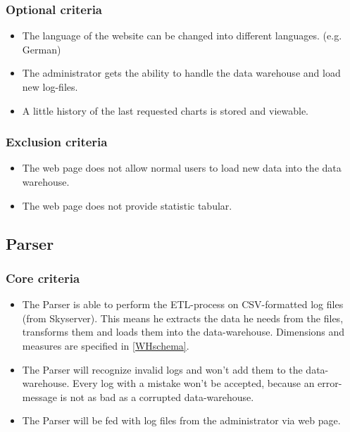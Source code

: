 \subsubsection{Optional criteria}
\begin{itemize}
\item The language of the website can be changed into different languages. (e.g. German)

\item The administrator gets the ability to handle the data warehouse and load new log-files.

\item A little history of the last requested charts is stored and viewable.
\end{itemize}

\subsubsection{Exclusion criteria}
\begin{itemize}
\item The web page does not allow normal users to load new data into the data warehouse.

\item The web page does not provide statistic tabular. 
\end{itemize}


\subsection{Parser}

\subsubsection{Core criteria} %
\begin{itemize}
\item The Parser is able to perform the ETL-process on CSV-formatted log files (from Skyserver). %
This means he extracts the data he needs from the files, transforms them 
and loads them into the data-warehouse. Dimensions and measures are specified in \ref{WHschema}.
  
\item The Parser will recognize invalid logs and won't add them to the data-warehouse.
 Every log with a mistake won't be accepted, because an error-message is not 
 as bad as a corrupted data-warehouse. 
 
\item The Parser will be fed with log files from the administrator via web page.
\end{itemize} 

